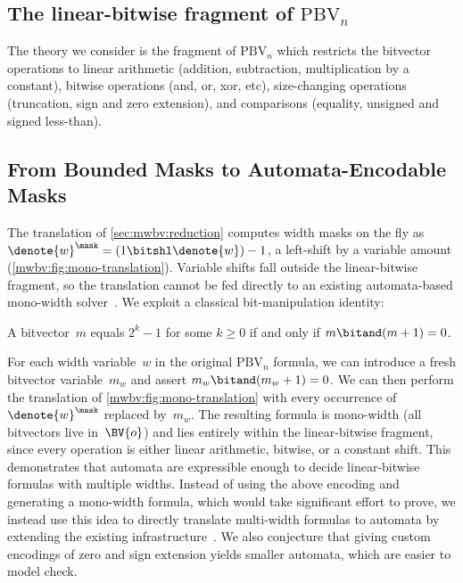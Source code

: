 \subsection{The linear-bitwise fragment of $\text{PBV}_n$}

The theory we consider is the fragment of $\text{PBV}_n$ which restricts the
bitvector operations to linear arithmetic (addition, subtraction,
multiplication by a constant), bitwise operations (and, or, xor, etc),
size-changing operations (truncation, sign and zero extension), and comparisons (equality, unsigned and signed less-than).

\subsection{From Bounded Masks to Automata-Encodable Masks}
\label{mwbv:sec:mask-substitution}

The translation of \cref{sec:mwbv:reduction} computes width masks on the fly as
$\denote{w}^\mask = (1 \bitshl \denote{w}) - 1$, a left-shift by a variable
amount (\cref{mwbv:fig:mono-translation}).  Variable shifts fall outside the
linear-bitwise fragment, so the translation cannot be fed directly to an existing
automata-based mono-width solver~\citep{bhat2025certified}.
%
We exploit a classical bit-manipulation identity:
%
\begin{lemma}\label{mwbv:lem:mask-char}
  A bitvector~$m$ equals $2^k - 1$ for some $k \geq 0$
  if and only if $m \bitand (m + 1) = 0$.
\end{lemma}
%
\noindent
For each width variable~$w$ in the original $\text{PBV}_n$ formula, we
can introduce a fresh bitvector variable~$m_w$ and assert
$m_w \bitand (m_w + 1) = 0$.
We can then perform the translation of \cref{mwbv:fig:mono-translation}
with every occurrence of~$\denote{w}^\mask$ replaced by~$m_w$.
The resulting formula is mono-width (all bitvectors live in~$\BV{o}$)
and lies entirely within the linear-bitwise fragment,
since every operation is either linear arithmetic, bitwise, or a constant shift.
%
This demonstrates that automata are expressible enough to decide linear-bitwise
formulas with multiple widths.
%
Instead of using the above encoding and generating a mono-width formula, which
would take significant effort to prove, we instead use this idea to directly
translate multi-width formulas to automata by extending the existing
infrastructure~\citep{bhat2025certified}.
%
We also conjecture that giving custom encodings of zero and sign extension yields
smaller automata, which are easier to model check.

